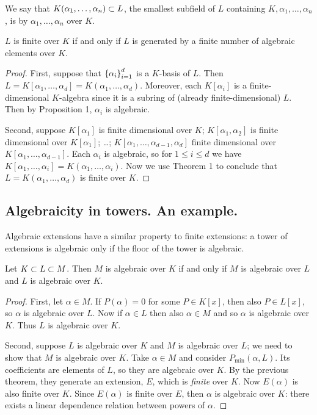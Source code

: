 \begin{dfn}
We say that $K(\alpha_1, \dotsc, \alpha_n) \subset L$, the smallest subfield of $L$ containing $K, \alpha_1, \dotsc, \alpha_n$, is  by $\alpha_1, \dotsc, \alpha_n$ over $K$.
\end{dfn}

\begin{thm}
$L$ is finite over $K$ if and only if $L$ is generated by a finite number of algebraic elements over $K$.
\end{thm}
\begin{proof}
First, suppose that $\left\{\alpha_i\right\}_{i=1}^{d}$ is a $K$-basis of $L$. Then $L = K[\alpha_1, \dotsc, \alpha_d] = K(\alpha_1, \dotsc, \alpha_d)$. Moreover, each $K[\alpha_i]$ is a finite-dimensional $K$-algebra since it is a subring of (already finite-dimensional) $L$. Then by Proposition 1, $\alpha_i$ is algebraic.

Second, suppose $K[\alpha_1]$ is finite dimensional over $K$; $K[\alpha_1, \alpha_2]$ is finite dimensional over $K[\alpha_1]$; \ldots; $K[\alpha_1, \dotsc, \alpha_{d-1}, \alpha_d]$ finite dimensional over $K[\alpha_1, \dotsc, \alpha_{d-1}]$. Each $\alpha_i$ is algebraic, so for $1 \leq i \leq d$ we have $K[\alpha_1, \dotsc, \alpha_i] = K(\alpha_1, \dotsc, \alpha_i)$. Now we use Theorem 1 to conclude that $L = K(\alpha_1, \dotsc, \alpha_d)$ is finite over $K$.
\end{proof}

\subsection{Algebraicity in towers. An example.}
Algebraic extensions have a similar property to finite extensions: a tower of extensions is algebraic only if the floor of the tower is algebraic.

\begin{thm}
Let $K \subset L \subset M$. Then $M$ is algebraic over $K$ if and only if $M$ is algebraic over $L$ and $L$ is algebraic over $K$.
\end{thm}
\begin{proof}
First, let $\alpha \in M$. If $P(\alpha) = 0$ for some $P \in K[x]$, then also $P \in L[x]$, so $\alpha$ is algebraic over $L$. Now if $\alpha \in L$ then also $\alpha \in M$ and so $\alpha$ is algebraic over $K$. Thus $L$ is algebraic over $K$.

Second, suppose $L$ is algebraic over $K$ and $M$ is algebraic over $L$; we need to show that $M$ is algebraic over $K$. Take $\alpha \in M$ and consider $P_{\min}(\alpha, L)$. Its coefficients are elements of $L$, so they are algebraic over $K$. By the previous theorem, they generate an extension, $E$, which is \emph{finite} over $K$. Now $E(\alpha)$ is also finite over $K$. Since $E(\alpha)$ is finite over $E$, then $\alpha$ is algebraic over $K$: there exists a linear dependence relation between powers of $\alpha$.
\end{proof}

